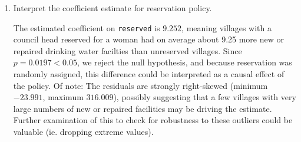 \documentclass[12pt,letterpaper]{article}
\begin{document}
\begin{enumerate}
\begin{verbatim}
		Coefficients:
            Estimate Std. Error t value Pr(>|t|)    
(Intercept)   14.738      2.286   6.446 4.22e-10 ***
reserved       9.252      3.948   2.344   0.0197 * 
	\end{verbatim}
	\vspace{2cm}
	\item [(c)] Interpret the coefficient estimate for reservation policy. 
	\vspace{1cm}

The estimated coefficient on \texttt{reserved} is $9.252$, meaning villages with a council head reserved for a woman had on average about 9.25 more new or repaired drinking water facilties than unreserved villages. Since $p = 0.0197 < 0.05$, we reject the null hypothesis, and because reservation was randomly assigned, this difference could be interpreted as a causal effect of the policy. Of note: The residuals are strongly right-skewed (minimum $-23.991$, maximum $316.009$), possibly suggesting that a few villages with very large numbers of new or repaired facilities may be driving the estimate. Further examination of this to check for robustness to these outliers could be valuable (ie. dropping extreme values).\end{enumerate}


\end{document}
